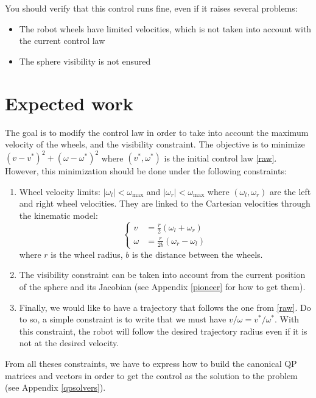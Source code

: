 \documentclass{ecnreport}
\begin{document}
You should verify that this control runs fine, even if it raises several problems:
\begin{itemize}
 \item The robot wheels have limited velocities, which is not taken into account with the current control law
 \item The sphere visibility is not ensured
\end{itemize}


\section{Expected work}

The goal is to modify the control law in order to take into account the maximum velocity of the wheels, and the visibility constraint.
The objective is to minimize $(v-v^*)^2 + (\omega-\omega^*)^2$ where $(v^*,\omega^*)$ is the initial control law \eqref{raw}.
However, this minimization should be done under the following constraints:

\begin{enumerate}
 \item Wheel velocity limits: $|\omega_l| < \omega_{\max}$ and $|\omega_r| < \omega_{\max}$ where $(\omega_l, \omega_r)$ are the left and right wheel velocities. 
 They are linked to the Cartesian velocities through the kinematic model:
\begin{equation}
  \left\{\begin{array}{ll}
         v &= \frac{r}{2}(\omega_l + \omega_r) \\ \omega &=  \frac{r}{2b}(\omega_r - \omega_l)
        \end{array}\right.
\end{equation}where $r$ is the wheel radius, $b$ is the distance between the wheels.
\item The visibility constraint can be taken into account from the current position of the sphere and its Jacobian (see Appendix \ref{pioneer} for how to get them).
\item Finally, we would like to have a trajectory that follows the one from \eqref{raw}. Do to so, a simple constraint is to write that we must have $v/\omega = v^*/\omega^*$. With this constraint, 
the robot will follow the desired trajectory radius even if it is not at the desired velocity.
\end{enumerate}
From all theses constraints, we have to express how to build the canonical QP matrices and vectors in order to get the control as the solution to the problem (see Appendix \ref{qpsolvers}).
\end{document}
